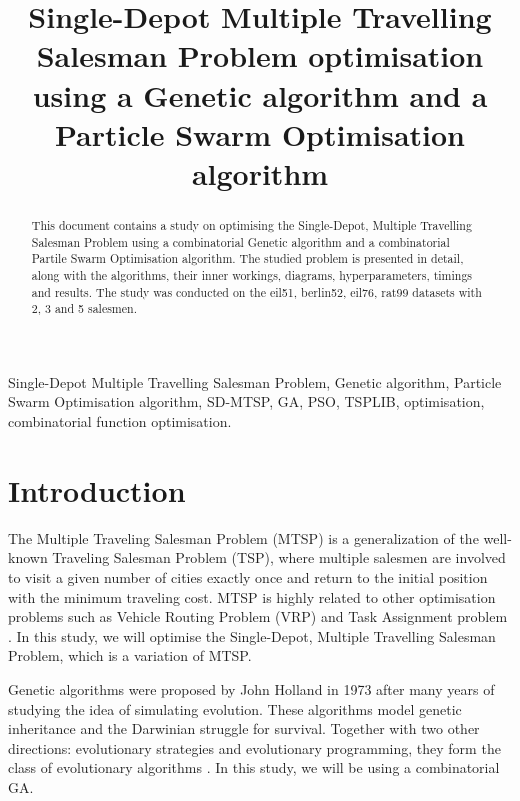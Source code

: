 \documentclass[conference]{IEEEtran}
\begin{document}
\title{Single-Depot Multiple Travelling Salesman Problem optimisation using a Genetic algorithm and a Particle Swarm Optimisation algorithm}

\author{
}
\maketitle

\begin{abstract}
    This document contains a study on optimising the Single-Depot, Multiple Travelling Salesman Problem using a combinatorial
    Genetic algorithm and a combinatorial Partile Swarm Optimisation algorithm. The studied problem is presented in detail, along
    with the algorithms, their inner workings, diagrams, hyperparameters, timings and results. The study was conducted on the eil51,
    berlin52, eil76, rat99 datasets with 2, 3 and 5 salesmen.
\end{abstract}

\begin{IEEEkeywords}
Single-Depot Multiple Travelling Salesman Problem, Genetic algorithm, Particle Swarm Optimisation algorithm, SD-MTSP,
GA, PSO, TSPLIB, optimisation, combinatorial function optimisation.
\end{IEEEkeywords}

\section{Introduction}
The Multiple Traveling Salesman Problem (MTSP) is a generalization of the well-known Traveling Salesman Problem (TSP),
where multiple salesmen are involved to visit a given number of cities exactly once and return to the initial position
with the minimum traveling cost. MTSP is highly related to other optimisation problems such as Vehicle Routing Problem (VRP)
and Task Assignment problem \cite{b1}. In this study, we will optimise the Single-Depot, Multiple Travelling Salesman Problem,
which is a variation of MTSP.

Genetic algorithms were proposed by John Holland in 1973 after many years of studying the idea of simulating evolution.
These algorithms model genetic inheritance and the Darwinian struggle for survival. Together with two other directions: evolutionary
strategies and evolutionary programming, they form the class of evolutionary algorithms \cite{b2}. In this study, we will
be using a combinatorial GA.
\end{document}
